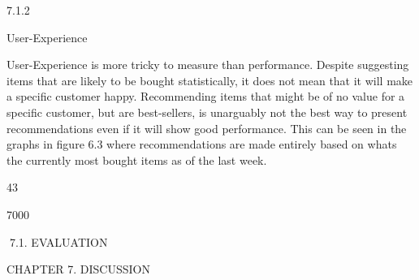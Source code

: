 7.1.2

User-Experience

User-Experience is more tricky to measure than performance. Despite suggesting items
that are likely to be bought statistically, it does not mean that it will make a specific
customer happy. Recommending items that might be of no value for a specific customer,
but are best-sellers, is unarguably not the best way to present recommendations even
if it will show good performance. This can be seen in the graphs in figure 6.3 where
recommendations are made entirely based on whats the currently most bought items as
of the last week.

43

7000

7.1. EVALUATION

CHAPTER 7. DISCUSSION

